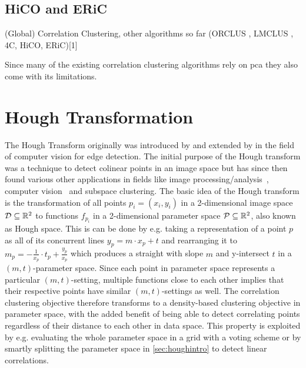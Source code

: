 \subsection{HiCO and ERiC}
(Global) Correlation Clustering, other algorithms so far (ORCLUS \cite{orclusaggarwal2000finding}, LMCLUS \cite{}, 4C, HiCO, ERiC)[1]

Since many of the existing correlation clustering algorithms rely on \gls{pca} they also come with its limitations.

\section{Hough Transformation}\label{sec:houghintro}
The Hough Transform originally was introduced by \textcite{houghOriginal1962method} and extended by \textcite{rosenfeld1969picture} in the field of computer vision for edge detection\cite{houghhistoryhart2009hough}. The initial purpose of the Hough transform was a technique to detect colinear points in an image space but has since then found various other applications in fields like image processing/analysis~\cite{rosenfeld1969picture,ballard1981generalizing}, computer vision~\cite{davies2004machine} and subspace clustering\cite{CASHachtert2008robust}.
The basic idea of the Hough transform is the transformation of all points $p_i = (x_i,y_i)$ in a 2-dimensional image space $\mathcal{D} \subseteq \mathbb{R}^2$ to functions $f_{p_i}$ in a 2-dimensional parameter space $\mathcal{P} \subseteq \mathbb{R}^2$, also known as Hough space\cite{illingworth1988survey}. This is can be done by e.g. taking a representation of a point $p$ as all of its concurrent lines $y_p = m \cdot x_p + t$ and rearranging it to $m_{p} = - \frac{1}{x_p} \cdot t_{p} + \frac{y_p}{x_p}$ which produces a straight with slope $m$ and y-intersect $t$ in a $(m,t)$-parameter space. Since each point in parameter space represents a particular $(m,t)$-setting, multiple functions close to each other implies that their respective points have similar $(m,t)$-settings as well. The correlation clustering objective therefore transforms to a density-based clustering objective in parameter space, with the added benefit of being able to detect correlating points regardless of their distance to each other in data space. This property is exploited by e.g. evaluating the whole parameter space in a grid with a voting scheme or by smartly splitting the parameter space in \autoref{sec:houghintro} to detect linear correlations. 


